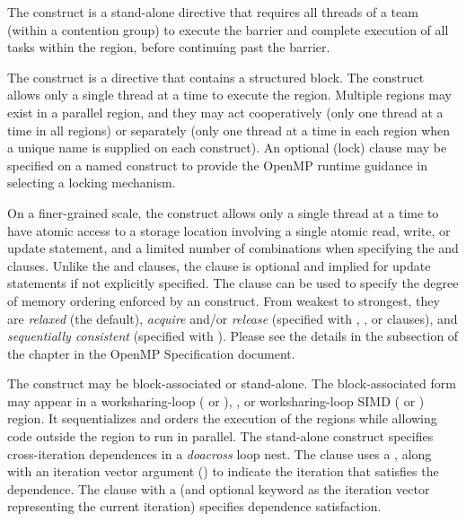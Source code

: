 \label{chap:synchronization}

The  construct is a stand-alone directive that requires all threads
of a team (within a contention group) to execute the barrier and complete
execution of all tasks within the region, before continuing past the barrier.

The  construct is a directive that contains a structured block. 
The construct allows only a single thread at a time to execute the region.
Multiple  regions may exist in a parallel region, and they may act
cooperatively (only one thread at a time in all  regions) or
separately (only one thread at a time in each  region when a
unique name is supplied on each  construct). An optional (lock)
 clause may be specified on a named  construct to
provide the OpenMP runtime guidance in selecting a locking mechanism.

On a finer-grained scale, the  construct allows only a single
thread at a time to have atomic access to a storage location involving a single
atomic read, write, or update statement, and a limited number of combinations
when specifying the  and  
clauses.  Unlike the  and   clauses, the
  clause is optional and implied for update
statements if not explicitly specified. The  clause can be
used to specify the degree of memory ordering enforced by an 
construct. From weakest to strongest, they are \emph{relaxed} (the default),
\emph{acquire} and/or \emph{release} (specified with ,
, or  clauses), and \emph{sequentially consistent}
(specified with ).  Please see the details in the  subsection of the 
chapter in the OpenMP Specification document.

The  construct may be block-associated or stand-alone. The
block-associated form may appear in a worksharing-loop ( or
), , or worksharing-loop SIMD ( or
) region. It sequentializes and orders the execution of the
 regions while allowing code outside the region to run in
parallel. The stand-alone  construct specifies cross-iteration
dependences in a \emph{doacross} loop nest. The  clause uses a
 , along with an iteration vector argument
() to indicate the iteration that satisfies the dependence.  The
 clause with a   (and
optional  keyword as the iteration vector
representing the current iteration) specifies dependence satisfaction.

